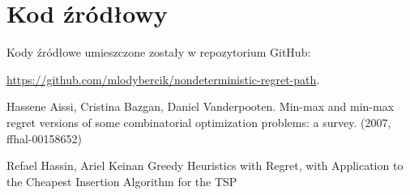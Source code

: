 \documentclass[10pt]{article}
\begin{document}
\newpage
\appendix

\section{Kod źródłowy}
Kody źródłowe umieszczone zostały w repozytorium GitHub:

\noindent \url{https://github.com/mlodybercik/nondeterministic-regret-path}.

\begin{thebibliography}{9}
    Hassene Aissi, Cristina Bazgan, Daniel Vanderpooten.
    Min-max and min-max regret versions of some combinatorial optimization problems: a survey. (2007, ffhal-00158652)

    Refael Hassin, Ariel Keinan
    Greedy Heuristics with Regret, with Application to the Cheapest Insertion Algorithm for the TSP

\end{thebibliography}
\end{document}
